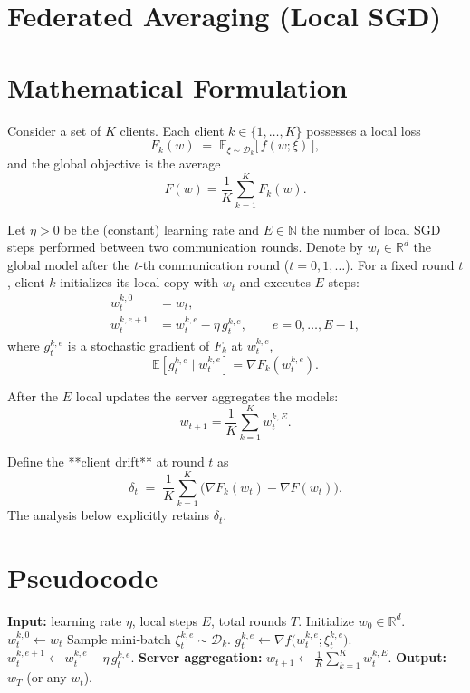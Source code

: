 \documentclass{article}
\newcommand{\E}{\mathbb{E}}
\newcommand{\R}{\mathbb{R}}
\begin{document}
\section*{Federated Averaging (Local SGD)}

\section*{Mathematical Formulation}
Consider a set of $K$ clients.  
Each client $k\in\{1,\dots,K\}$ possesses a local loss
\[
F_k(w)\;=\;\mathbb{E}_{\xi\sim\mathcal{D}_k}\big[\,f(w;\xi)\,\big],
\]
and the global objective is the average
\[
F(w)=\frac1K\sum_{k=1}^K F_k(w).
\]

Let $\eta>0$ be the (constant) learning rate and $E\in\mathbb{N}$ the number of local SGD steps performed between two communication rounds.  
Denote by $w_t\in\R^d$ the global model after the $t$‑th communication round ($t=0,1,\dots$).  
For a fixed round $t$, client $k$ initializes its local copy with $w_t$ and executes $E$ steps:
\[
\begin{aligned}
w_{t}^{k,0} &= w_t,\\
w_{t}^{k,e+1} &= w_{t}^{k,e} - \eta\, g_{t}^{k,e},
\qquad e=0,\dots,E-1,
\end{aligned}
\]
where $g_{t}^{k,e}$ is a stochastic gradient of $F_k$ at $w_{t}^{k,e}$,
\[
\E\!\left[g_{t}^{k,e}\mid w_{t}^{k,e}\right]=\nabla F_k\!\left(w_{t}^{k,e}\right).
\]

After the $E$ local updates the server aggregates the models:
\[
w_{t+1}= \frac1K\sum_{k=1}^K w_{t}^{k,E}.
\]

Define the **client drift** at round $t$ as
\[
\delta_t \;=\; \frac1K\sum_{k=1}^K \bigl(\nabla F_k(w_t)-\nabla F(w_t)\bigr).
\]
The analysis below explicitly retains $\delta_t$.

\section*{Pseudocode}
\begin{algorithm}[H]
\caption{Federated Averaging (Local SGD)}
\begin{algorithmic}[1]
\STATE \textbf{Input:} learning rate $\eta$, local steps $E$, total rounds $T$.
\STATE Initialize $w_0\in\R^d$.
        \STATE $w_{t}^{k,0}\leftarrow w_t$
            \STATE Sample mini‑batch $\xi_{t}^{k,e}\sim\mathcal{D}_k$.
            \STATE $g_{t}^{k,e}\leftarrow \nabla f\!\bigl(w_{t}^{k,e};\xi_{t}^{k,e}\bigr)$.
            \STATE $w_{t}^{k,e+1}\leftarrow w_{t}^{k,e}-\eta\, g_{t}^{k,e}$.
        \ENDFOR
    \ENDFOR
    \STATE \textbf{Server aggregation:} $w_{t+1}\leftarrow \frac1K\sum_{k=1}^K w_{t}^{k,E}$.
\ENDFOR
\STATE \textbf{Output:} $w_T$ (or any $w_t$).
\end{algorithmic}
\end{algorithm}
\end{document}
